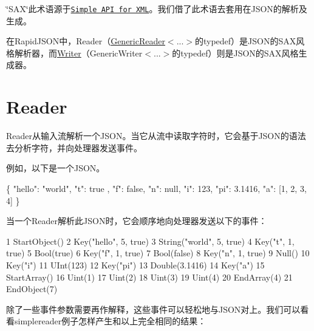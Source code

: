 \char`\"{}\+S\+A\+X\char`\"{}此术语源于\href{http://en.wikipedia.org/wiki/Simple_API_for_XML}{\tt Simple A\+PI for X\+ML}。我们借了此术语去套用在\+J\+S\+O\+N的解析及生成。

在\+Rapid\+J\+S\+O\+N中，{\ttfamily Reader}（{\ttfamily \hyperlink{class_generic_reader}{Generic\+Reader}$<$...$>$}的typedef）是\+J\+S\+O\+N的\+S\+A\+X风格解析器，而{\ttfamily \hyperlink{class_writer}{Writer}}（{\ttfamily Generic\+Writer$<$...$>$}的typedef）则是\+J\+S\+O\+N的\+S\+A\+X风格生成器。\hypertarget{md_Cadriciel_Commun_Externe_RapidJSON_doc_sax.zh-cn_Reader}{}\section{Reader}\label{md_Cadriciel_Commun_Externe_RapidJSON_doc_sax.zh-cn_Reader}
{\ttfamily Reader}从输入流解析一个\+J\+S\+O\+N。当它从流中读取字符时，它会基于\+J\+S\+O\+N的语法去分析字符，并向处理器发送事件。

例如，以下是一个\+J\+S\+O\+N。


\begin{DoxyCode}
\{
    \textcolor{stringliteral}{"hello"}: \textcolor{stringliteral}{"world"},
    \textcolor{stringliteral}{"t"}: true ,
    \textcolor{stringliteral}{"f"}: \textcolor{keyword}{false},
    \textcolor{stringliteral}{"n"}: null,
    \textcolor{stringliteral}{"i"}: 123,
    \textcolor{stringliteral}{"pi"}: 3.1416,
    \textcolor{stringliteral}{"a"}: [1, 2, 3, 4]
\}
\end{DoxyCode}


当一个{\ttfamily Reader}解析此\+J\+S\+O\+N时，它会顺序地向处理器发送以下的事件：


\begin{DoxyCode}
1 StartObject()
2 Key("hello", 5, true)
3 String("world", 5, true)
4 Key("t", 1, true)
5 Bool(true)
6 Key("f", 1, true)
7 Bool(false)
8 Key("n", 1, true)
9 Null()
10 Key("i")
11 UInt(123)
12 Key("pi")
13 Double(3.1416)
14 Key("a")
15 StartArray()
16 Uint(1)
17 Uint(2)
18 Uint(3)
19 Uint(4)
20 EndArray(4)
21 EndObject(7)
\end{DoxyCode}


除了一些事件参数需要再作解释，这些事件可以轻松地与\+J\+S\+O\+N对上。我们可以看看{\ttfamily simplereader}例子怎样产生和以上完全相同的结果：


